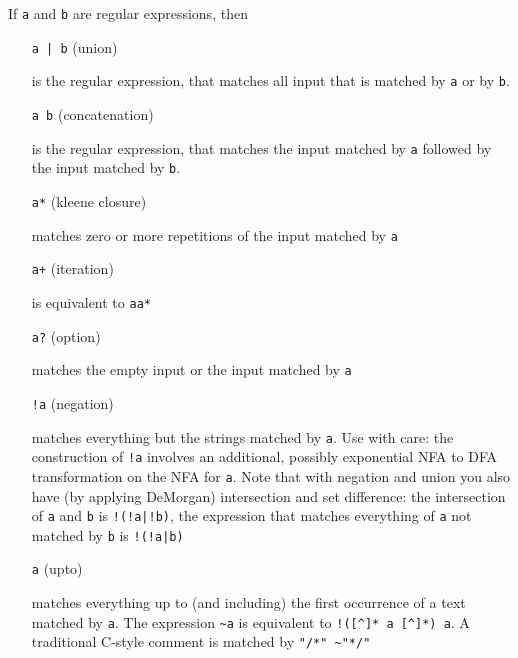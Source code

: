 \documentclass[11pt]{scrartcl}
\begin{document}
    If \texttt{a} and \texttt{b} are regular expressions, then

    \begin{itemize}
     
          \item[\texttt{a | b}] (union) 

            is the regular expression, that matches
            all input that is matched by \texttt{a} or by \texttt{b}.
          
          
          \item[\texttt{a b}] (concatenation) 
            
            is the regular expression,
            that matches the input matched by \texttt{a} followed by the 
            input matched by \texttt{b}.
          
          
          \item[\texttt{a*}] (kleene closure) 

            matches zero or more repetitions
            of the input matched by \texttt{a}
          
          
          \item[\texttt{a+}] (iteration)

          is equivalent to \texttt{aa*}
          
          
          \item[\texttt{a?}] (option)

          matches the empty input or the input matched
            by \texttt{a}

          \item[\texttt{!a}] (negation)

          matches everything but the strings matched by \texttt{a}. 
          Use with care: the construction of \verb+!a+ involves
          an additional, possibly exponential NFA to DFA transformation 
          on the NFA for \texttt{a}. Note that
          with negation and union you also have (by applying DeMorgan)
          intersection and set difference: the intersection of 
          \texttt{a} and \texttt{b} is \verb+!(!a|!b)+, the expression 
          that matches everything of \texttt{a} not matched by \texttt{b} is 
          \verb+!(!a|b)+

          \item[\texttt{\symbol{126}a}] (upto)

          matches everything up to (and including) the first occurrence of a text
          matched by \texttt{a}. The expression \verb-~a- is equivalent
          to \verb-!([^]* a [^]*) a-. A traditional C-style comment
          is matched by \verb-"/*" ~"*/"-
          

\end{itemize}
\end{document}
